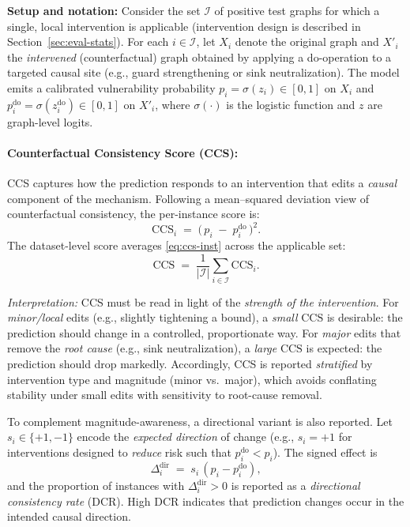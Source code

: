 \documentclass{buthesis}
\begin{document}
\textbf{Setup and notation:}
Consider the set $\mathcal{I}$ of positive test graphs for which a single, local intervention is applicable (intervention design is described in Section~\ref{sec:eval-stats}). For each $i\in\mathcal{I}$, let $X_i$ denote the original graph and $X'_i$ the \emph{intervened} (counterfactual) graph obtained by applying a do-operation to a targeted causal site (e.g., guard strengthening or sink neutralization). The model emits a calibrated vulnerability probability $p_i=\sigma(z_i)\in[0,1]$ on $X_i$ and $p_i^{\mathrm{do}}=\sigma(z_i^{\mathrm{do}})\in[0,1]$ on $X'_i$, where $\sigma(\cdot)$ is the logistic function and $z$ are graph-level logits.

\paragraph{Counterfactual Consistency Score (CCS):}
CCS captures how the prediction responds to an intervention that edits a \emph{causal} component of the mechanism. Following a mean–squared deviation view of counterfactual consistency, the per-instance score is:
\begin{equation}
\label{eq:ccs-inst}
\mathrm{CCS}_i \;=\; \big(\,p_i \;-\; p_i^{\mathrm{do}}\,\big)^2.
\end{equation}
The dataset-level score averages \eqref{eq:ccs-inst} across the applicable set:
\begin{equation}
\label{eq:ccs-avg}
\mathrm{CCS} \;=\; \frac{1}{|\mathcal{I}|}\sum_{i\in\mathcal{I}} \mathrm{CCS}_i.
\end{equation}

\textit{Interpretation:} CCS must be read in light of the \emph{strength of the intervention}. For \emph{minor/local} edits (e.g., slightly tightening a bound), a \emph{small} $\mathrm{CCS}$ is desirable: the prediction should change in a controlled, proportionate way. For \emph{major} edits that remove the \emph{root cause} (e.g., sink neutralization), a \emph{large} $\mathrm{CCS}$ is expected: the prediction should drop markedly. Accordingly, CCS is reported \emph{stratified} by intervention type and magnitude (minor vs.\ major), which avoids conflating stability under small edits with sensitivity to root-cause removal.

To complement magnitude-awareness, a directional variant is also reported. Let $s_i\in\{+1,-1\}$ encode the \emph{expected direction} of change (e.g., $s_i{=}+1$ for interventions designed to \emph{reduce} risk such that $p_i^{\mathrm{do}}\!<\!p_i$). The signed effect is
\begin{equation}
\label{eq:ccs-signed}
\Delta^{\mathrm{dir}}_i \;=\; s_i\,(p_i - p_i^{\mathrm{do}}),
\end{equation}
and the proportion of instances with $\Delta^{\mathrm{dir}}_i>0$ is reported as a \emph{directional consistency rate} (DCR). High DCR indicates that prediction changes occur in the intended causal direction.
\end{document}
